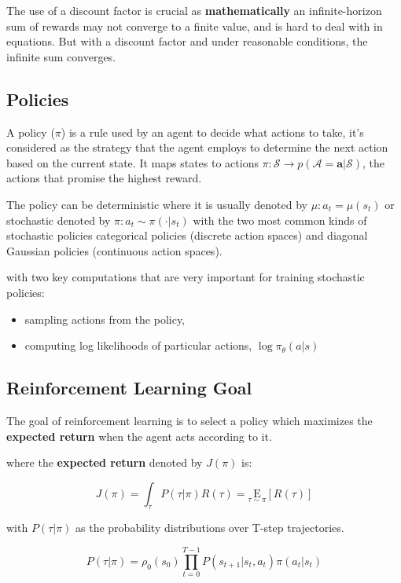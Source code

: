 The use of a discount factor is crucial as \textbf{mathematically} an infinite-horizon sum of rewards may not converge to a finite value, and is hard to deal with in equations. But with a discount factor and under reasonable conditions, the infinite sum converges.

\subsection{Policies}
A policy ($\pi$) is a rule used by an agent to decide what actions to take, it's considered as the strategy that the agent employs to determine the next action based on the current state. It maps states to actions $ \pi : \mathcal{S} \rightarrow p(\mathcal{A}=\mathbf{a} | \mathcal{S}) $, the actions that promise the highest reward.

The policy can be deterministic where it is usually denoted by $ \mu: a_{t}=\mu\left(s_{t}\right) $
or stochastic denoted by $ \pi:  a_{t} \sim \pi\left(\cdot | s_{t}\right) $
with the two most common kinds of stochastic policies categorical policies (discrete action spaces) and diagonal Gaussian policies (continuous action spaces).

with two key computations that are very important for training stochastic policies:
\begin{itemize}
		\item sampling actions from the policy,
		\item computing log likelihoods of particular actions, $ \log \pi_{\theta}(a|s) $
\end{itemize}


\subsection{Reinforcement Learning Goal}
The goal of reinforcement learning is to select a policy which maximizes the \textbf{expected return} when the agent acts according to it.

where the \textbf{expected return} denoted by $ J(\pi) $ is:
\begin{center}
		\begin{equation} \label{eq:expected_return}
				J(\pi)=\int_{\tau} P(\tau | \pi) R(\tau)=\underset{\tau \sim \pi}{\mathrm{E}}[R(\tau)]
		\end{equation}
\end{center}

with $ P(\tau | \pi) $ as the probability distributions over T-step trajectories.
\begin{center}
		\begin{equation}
				P(\tau | \pi)=\rho_{0}\left(s_{0}\right) \prod_{t=0}^{T-1} P\left(s_{t+1} | s_{t}, a_{t}\right) \pi\left(a_{t} | s_{t}\right)
		\end{equation}
\end{center}

